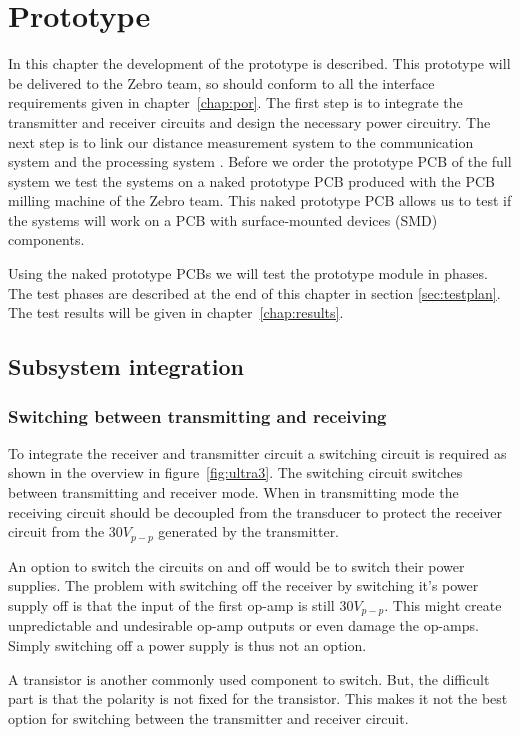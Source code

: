 \chapter{Prototype}
In this chapter the development of the prototype is described.
This prototype will be delivered to the Zebro team, so should conform to all the interface requirements given in chapter~\ref{chap:por}.
The first step is to integrate the transmitter and receiver circuits and design the necessary power circuitry.
The next step is to link our distance measurement system to the communication system \cite{communication} and the processing system \cite{processing}.
Before we order the prototype PCB of the full system we test the systems on a naked prototype PCB produced with the PCB milling machine of the Zebro team.
This naked prototype PCB allows us to test if the systems will work on a PCB with surface-mounted devices (SMD) components.

Using the naked prototype PCBs we will test the prototype module in phases.
The test phases are described at the end of this chapter in section \ref{sec:testplan}.
The test results will be given in chapter~\ref{chap:results}.

\section{Subsystem integration}

\subsection*{Switching between transmitting and receiving}

To integrate the receiver and transmitter circuit a switching circuit is required as shown in the overview in figure~\ref{fig:ultra3}.
The switching circuit switches between transmitting and receiver mode.
When in transmitting mode the receiving circuit should be decoupled from the transducer to protect the receiver circuit from the $30V_{p-p}$ generated by the transmitter.

An option to switch the circuits on and off would be to switch their power supplies.
The problem with switching off the receiver by switching it's power supply off is that the input of the first op-amp is still $30V_{p-p}$.
This might create unpredictable and undesirable op-amp outputs or even damage the op-amps.
Simply switching off a power supply is thus not an option.

A transistor is another commonly used component to switch. But, the difficult part is that the polarity is not fixed for the transistor. This makes it not the best option for switching between the transmitter and receiver circuit.


